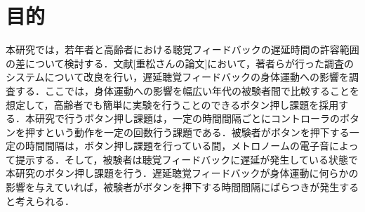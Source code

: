 \section{目的}
本研究では，若年者と高齢者における聴覚フィードバックの遅延時間の許容範囲の差について検討する．文献[重松さんの論文]において，著者らが行った調査のシステムについて改良を行い，遅延聴覚フィードバックの身体運動への影響を調査する．ここでは，身体運動への影響を幅広い年代の被験者間で比較することを想定して，高齢者でも簡単に実験を行うことのできるボタン押し課題を採用する．本研究で行うボタン押し課題は，一定の時間間隔ごとにコントローラのボタンを押すという動作を一定の回数行う課題である．被験者がボタンを押下する一定の時間間隔は，ボタン押し課題を行っている間，メトロノームの電子音によって提示する．そして，被験者は聴覚フィードバックに遅延が発生している状態で本研究のボタン押し課題を行う．遅延聴覚フィードバックが身体運動に何らかの影響を与えていれば，被験者がボタンを押下する時間間隔にばらつきが発生すると考えられる．
\newpage


